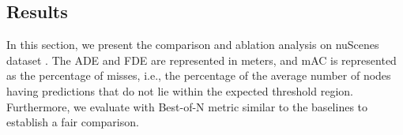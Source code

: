 \documentclass{article}
\begin{document}







\subsection{Results}
In this section, we present the comparison and ablation analysis on nuScenes dataset \cite{caesar2020nuscenes}. The ADE and FDE are represented in meters, and mAC is represented as the percentage of misses,  i.e., the percentage of the average number of nodes having predictions that do not lie within the expected threshold region. Furthermore, we evaluate with Best-of-N metric similar to the baselines to establish a fair comparison.
\end{document}
